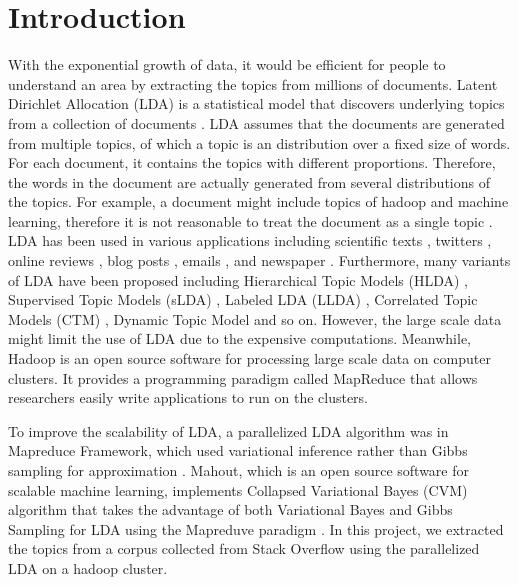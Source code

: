 \documentclass[conference]{IEEEtran}
\begin{document}
\section{Introduction}
With the exponential growth of data, it would be efficient for people to understand an area by extracting the topics from millions of documents. Latent Dirichlet Allocation (LDA) is a statistical model that discovers underlying topics from a collection of documents \cite{blei2003latent}. LDA assumes that the documents are generated from multiple topics, of which a topic is an distribution over a fixed size of words. For each document, it contains the topics with different proportions. Therefore, the words in the document are actually generated from several distributions of the topics. For example, a document might include topics of hadoop and machine learning, therefore it is not reasonable to treat the document as a single topic \cite{srivastava2010text}. LDA has been used in various applications including scientific texts \cite{blei2003latent,griffiths2004finding}, twitters \cite{zhao2011comparing,hong2010empirical}, online reviews \cite{titov2008modeling}, blog posts \cite{yano2009predicting}, emails \cite{mccallum2005topic}, and newspaper \cite{wei2006lda}. Furthermore, many variants of LDA have been proposed including Hierarchical Topic Models (HLDA) \cite{griffiths2004hierarchical,blei2010nested}, Supervised Topic Models (sLDA) \cite{blei2010supervised}, Labeled LDA (LLDA) \cite{ramage2009labeled}, Correlated Topic Models (CTM) \cite{lafferty2005correlated,blei2007correlated}, Dynamic Topic Model \cite{blei2006dynamic} and so on. However, the large scale data might limit the use of LDA due to the expensive computations. Meanwhile, Hadoop is an open source software for processing large scale data on computer clusters. It provides a programming paradigm called MapReduce that allows researchers easily write applications to run on the clusters.


To improve the scalability of LDA, a parallelized LDA algorithm was in Mapreduce Framework, which used variational inference rather than Gibbs sampling for approximation \cite{zhai2012mr}. Mahout, which is an open source software for scalable machine learning, implements Collapsed Variational Bayes (CVM) algorithm that takes the advantage of both Variational Bayes and Gibbs Sampling for LDA using the Mapreduve paradigm \cite{mahout_lda}. In this project, we extracted the topics from a corpus collected from Stack Overflow using the parallelized LDA on a hadoop cluster. 
\end{document}
